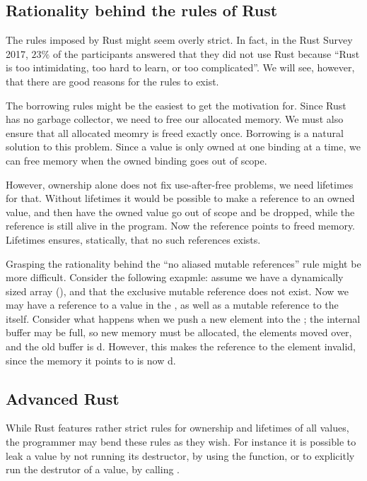 \documentclass[a4paper,twoside]{report}
\begin{document}


\subsection{Rationality behind the rules of Rust}
The rules imposed by Rust might seem overly strict.  In fact, in the Rust
Survey 2017, $23\%$ of the participants answered that they did not use Rust
because ``Rust is too intimidating, too hard to learn, or too
complicated''\cite{rustsurvey2017}.  We will see, however, that there are good
reasons for the rules to exist.

The borrowing rules might be the easiest to get the motivation for.  Since Rust
has no garbage collector, we need to free our allocated memory.  We must also
ensure that all allocated meomry is freed exactly once.  Borrowing is a natural
solution to this problem. Since a value is only owned at one binding at a time,
we can free memory when the owned binding goes out of scope.

However, ownership alone does not fix use-after-free problems, we need
lifetimes for that.  Without lifetimes it would be possible to make a reference
to an owned value, and then have the owned value go out of scope and be
dropped, while the reference is still alive in the program. Now the reference
points to freed memory. Lifetimes ensures, statically, that no such references
exists.

Grasping the rationality behind the ``no aliased mutable references'' rule
might be more difficult. Consider the following exapmle: assume we have a
dynamically sized array (), and that the exclusive mutable reference
does not exist. Now we may have a reference to a value in the , as
well as a mutable reference to the  itself.  Consider what happens
when we push a new element into the ; the internal buffer may be
full, so new memory must be allocated, the elements moved over, and the old
buffer is d.  However, this makes the reference to the element
invalid, since the memory it points to is now d.

\subsection{Advanced Rust}
While Rust features rather strict rules for ownership and lifetimes of all
values, the programmer may bend these rules as they wish.  For instance it is
possible to leak a value by not running its destructor, by using the
 function, or to explicitly run the destrutor of a
value, by calling .
\end{document}
